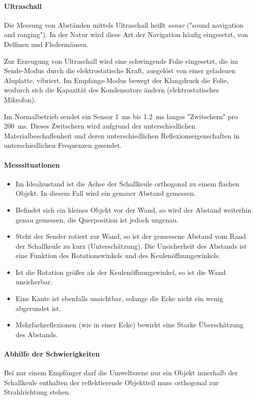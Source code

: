 				\paragraph{Ultraschall}
					Die Messung von Abständen mittels Ultraschall heißt \emph{sonar} ("sound navigation and ranging"). In der Natur wird diese Art der Navigation häufig eingesetzt, \zB von Delfinen und Fledermäusen.
					
					Zur Erzeugung von Ultraschall wird eine schwingende Folie eingesetzt, die im Sende-Modus durch die elektrostatische Kraft, ausgelöst von einer geladenen Aluplatte, vibriert. Im Empfangs-Modus bewegt der Klangdruck die Folie, wodurch sich die Kapazität des Kondensators ändern (elektrostatisches Mikrofon).
					
					Im Normalbetrieb sendet ein Sensor \SI{1}{\milli\second} bis \SI{1.2}{\milli\second} langes "Zwitschern" pro \SI{200}{\milli\second}. Dieses Zwitschern wird aufgrund der unterschiedlichen Materialbeschaffenheit und deren unterschiedlichen Reflexionseigenschaften in unterschiedlichen Frequenzen gesendet.

				\paragraph{Messsituationen}
					\begin{itemize}
						\item Im Idealzustand ist die Achse der Schallkeule orthogonal zu einem flachen Objekt. In diesem Fall wird ein genauer Abstand gemessen.
						\item Befindet sich ein kleines Objekt vor der Wand, so wird der Abstand weiterhin genau gemessen, die Querposition ist jedoch ungenau.
						\item Steht der Sender rotiert zur Wand, so ist der gemessene Abstand vom Rand der Schallkeule zu kurz (Unterschätzung). Die Unsicherheit des Abstands ist eine Funktion des Rotationswinkels und des Keulenöffnungswinkels.
						\item Ist die Rotation größer als der Keulenöffnungswinkel, so ist die Wand unsicherbar.
						\item Eine Kante ist ebenfalls unsichtbar, solange die Ecke nicht ein wenig abgerundet ist.
						\item Mehrfachreflexionen (wie in einer Ecke) bewirkt eine Starke Überschätzung des Abstands.
					\end{itemize}

				\paragraph{Abhilfe der Schwierigkeiten}
					Bei nur einem Empfänger darf die Umweltszene nur ein Objekt innerhalb der Schallkeule enthalten der reflektierende Objektteil muss orthogonal zur Strahlrichtung stehen.
					
